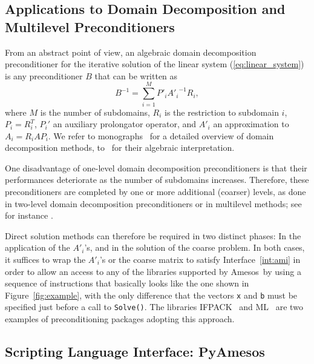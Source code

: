\documentclass[acmtocl]{acmtrans2m}
\newcommand{\amesos}{{\sc Amesos}}
\begin{document}
\subsection{Applications to Domain Decomposition and Multilevel Preconditioners}
\label{sec:preconditioner}

From an abstract point of view, an algebraic domain decomposition
preconditioner for the iterative solution of the linear system
(\ref{eq:linear_system})
is any preconditioner $B$ that can be written as
\begin{equation}
\label{eq:prec}
B^{-1} = \sum_{i=1}^M P'_i {A'_i}^{-1} R_i,
\end{equation}
where
$M$ is the number of subdomains, $R_i$ is the restriction to subdomain $i$,
  $P_i = R_i^T$, $P_i'$ an auxiliary prolongator operator, and 
$A'_i$ an approximation to $A_i = R_i A P_i$.  We refer to 
monographs~\cite{QV2,smith96parallel} for a detailed
overview of domain decomposition methods, to~\cite{saad96iterative} for their
algebraic interpretation.

One disadvantage of one-level domain decomposition preconditioners is that
their performances deteriorate as the number of subdomains increases.
Therefore, these preconditioners are completed by one or more additional
(coarser) levels, as done in two-level domain decomposition preconditioners or
in multilevel methods; 
see for instance \cite{brandt.classic,hack.book}. 

Direct solution methods can therefore be required in two distinct phases: In the application of
the $A'_i$'s, and in the solution of the coarse problem. In both cases, it
suffices to wrap the $A'_i$'s or the coarse matrix to satisfy
Interface~\ref{int:ami} in order to allow an access to any of the libraries
supported by \amesos\ by using a sequence of instructions that basically looks
like the one shown in Figure~\ref{fig:example}, with the only difference that
the vectors \verb!x! and \verb!b! must be specified just before a call to
\verb!Solve()!.  The libraries IFPACK~\cite{ifpack-guide} and
ML~\cite{ml-guide} are two examples of preconditioning packages adopting this
approach.

\subsection{Scripting Language Interface: PyAmesos}
\label{sec:pyamesos}
\end{document}
